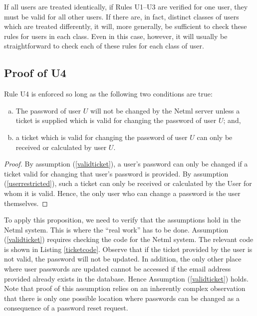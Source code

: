 If all users are treated identically, if Rules U1--U3 are verified for one user, they must be valid for all other users. If there are, in fact, distinct classes of users which are treated differently, it will, more generally, be sufficient to check these rules for users in each class. Even in this case, however, it will usually be straightforward to check each of these rules for each class of user.


\subsection{Proof of U4}
\begin{proposition}
Rule U4 is enforced so long as the following two conditions are true:
\begin{enumerate}[(a)]
\item\label{validticket} The password of  user $U$ will not be changed by the Netml server
unless a ticket is supplied which is valid for changing the password of
user $U$; and,

\item\label{userrestricted} a ticket which is valid for changing the password of user $U$
can only be received or calculated by user $U$.

\end{enumerate}
\end{proposition}

\begin{proof} 
By assumption (\ref{validticket}), a user's password can only be changed if a ticket valid for changing that user's password is provided. By assumption (\ref{userrestricted}), such a ticket can only be received or calculated by the User for whom it is valid. Hence, the only user who can change a password is the user themselves.
\end{proof}

To apply this proposition, we need to verify that the assumptions hold in the Netml system. This is where the ``real work'' has to be done. Assumption (\ref{validticket}) requires checking the code for the Netml system. The relevant code is shown in Listing \ref{ticketcode}. Observe that if the ticket provided by the user is not valid, the password will not be updated. In addition, the only other place where user passwords are updated cannot be accessed if the email address provided already exists in the database. Hence Assumption (\ref{validticket}) holds. Note that proof of this assumption relies on an inherently complex observation that there is only one possible location where passwords can be changed as a consequence of a password reset request.

